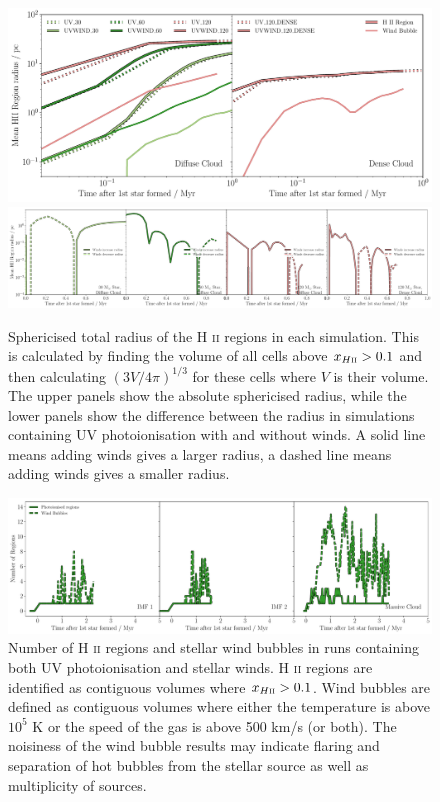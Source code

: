 \documentclass[a4paper,fleqn,usenatbib]{mnras}
\newcommand{\HII}{H \textsc{ii}\xspace}
\begin{document}
\begin{figure}
	\includegraphics[width=2\columnwidth]{../plots/radius_both.pdf}
	\includegraphics[width=2\columnwidth]{../plots/radius_both_compare.pdf}
	\caption{Sphericised total radius of the \HII regions in each simulation. This is calculated by finding the volume of all cells above $x_{\HII}>0.1$ and then calculating $(3 V /4 \pi)^{1/3}$ for these cells where $V$ is their volume. The upper panels show the absolute sphericised radius, while the lower panels show the difference between the radius in simulations containing UV photoionisation with and without winds. A solid line means adding winds gives a larger radius, a dashed line means adding winds gives a smaller radius.}
	\label{fig:radius}
\end{figure}

\begin{figure}
\includegraphics[width=2\columnwidth]{../plots/findHIIregions.pdf}
\caption{Number of \HII regions and stellar wind bubbles in runs containing both UV photoionisation and stellar winds. \HII regions are identified as contiguous volumes where $x_{\HII} > 0.1$. Wind bubbles are defined as contiguous volumes where either the temperature is above $10^5$ K or the speed of the gas is above 500 km/s (or both). The noisiness of the wind bubble results may indicate flaring and separation of hot bubbles from the stellar source as well as multiplicity of sources.}
\label{fig:HIIregions}
\end{figure}
\end{document}
